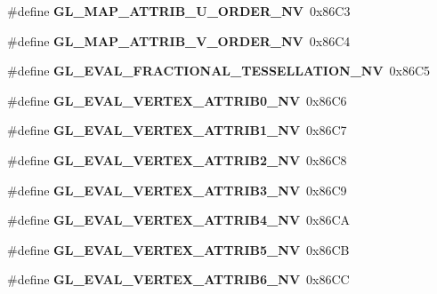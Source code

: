 \begin{DoxyCompactItemize}
\item 
\#define {\bfseries G\+L\+\_\+\+M\+A\+P\+\_\+\+A\+T\+T\+R\+I\+B\+\_\+\+U\+\_\+\+O\+R\+D\+E\+R\+\_\+\+N\+V}~0x86\+C3\label{_s_d_l__opengl_8h_ad5fc8ac75c66df7fce687013f6289fb2}

\item 
\#define {\bfseries G\+L\+\_\+\+M\+A\+P\+\_\+\+A\+T\+T\+R\+I\+B\+\_\+\+V\+\_\+\+O\+R\+D\+E\+R\+\_\+\+N\+V}~0x86\+C4\label{_s_d_l__opengl_8h_a394db60e8be8f50d0fd0c29f7c11a628}

\item 
\#define {\bfseries G\+L\+\_\+\+E\+V\+A\+L\+\_\+\+F\+R\+A\+C\+T\+I\+O\+N\+A\+L\+\_\+\+T\+E\+S\+S\+E\+L\+L\+A\+T\+I\+O\+N\+\_\+\+N\+V}~0x86\+C5\label{_s_d_l__opengl_8h_a14c37304a9d4ac1c31f39c64dbec46f2}

\item 
\#define {\bfseries G\+L\+\_\+\+E\+V\+A\+L\+\_\+\+V\+E\+R\+T\+E\+X\+\_\+\+A\+T\+T\+R\+I\+B0\+\_\+\+N\+V}~0x86\+C6\label{_s_d_l__opengl_8h_a96a26ce861f84834f5bd6715c817ac9b}

\item 
\#define {\bfseries G\+L\+\_\+\+E\+V\+A\+L\+\_\+\+V\+E\+R\+T\+E\+X\+\_\+\+A\+T\+T\+R\+I\+B1\+\_\+\+N\+V}~0x86\+C7\label{_s_d_l__opengl_8h_a48620293c4613b7095e0ac4309e23cf7}

\item 
\#define {\bfseries G\+L\+\_\+\+E\+V\+A\+L\+\_\+\+V\+E\+R\+T\+E\+X\+\_\+\+A\+T\+T\+R\+I\+B2\+\_\+\+N\+V}~0x86\+C8\label{_s_d_l__opengl_8h_ad0bc8f7d6e92a5c4de35c9c578a544c1}

\item 
\#define {\bfseries G\+L\+\_\+\+E\+V\+A\+L\+\_\+\+V\+E\+R\+T\+E\+X\+\_\+\+A\+T\+T\+R\+I\+B3\+\_\+\+N\+V}~0x86\+C9\label{_s_d_l__opengl_8h_a4a11f9477c91f5d32e7a7c3d212b438c}

\item 
\#define {\bfseries G\+L\+\_\+\+E\+V\+A\+L\+\_\+\+V\+E\+R\+T\+E\+X\+\_\+\+A\+T\+T\+R\+I\+B4\+\_\+\+N\+V}~0x86\+C\+A\label{_s_d_l__opengl_8h_aff5a17977361b33a4b5476c303a6d08f}

\item 
\#define {\bfseries G\+L\+\_\+\+E\+V\+A\+L\+\_\+\+V\+E\+R\+T\+E\+X\+\_\+\+A\+T\+T\+R\+I\+B5\+\_\+\+N\+V}~0x86\+C\+B\label{_s_d_l__opengl_8h_a6c9cecac2e07ec6509bc7ecbc118ee55}

\item 
\#define {\bfseries G\+L\+\_\+\+E\+V\+A\+L\+\_\+\+V\+E\+R\+T\+E\+X\+\_\+\+A\+T\+T\+R\+I\+B6\+\_\+\+N\+V}~0x86\+C\+C\label{_s_d_l__opengl_8h_ab627cd579c5ce0bb1716be1b41ed7efd}


\end{DoxyCompactItemize}

